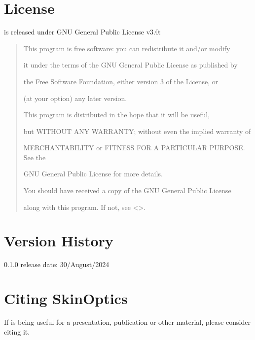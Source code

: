 \documentclass[letterpaper,10pt,english]{sphinxmanual}
\begin{document}
\chapter{License}
\label{\detokenize{index:license}}
\sphinxAtStartPar
{} is released under GNU General Public License v3.0:
\begin{quote}

\begin{DUlineblock}{0em}
\item[] This program is free software: you can redistribute it and/or modify
\item[] it under the terms of the GNU General Public License as published by
\item[] the Free Software Foundation, either version 3 of the License, or
\item[] (at your option) any later version.
\end{DUlineblock}

\begin{DUlineblock}{0em}
\item[] This program is distributed in the hope that it will be useful,
\item[] but WITHOUT ANY WARRANTY; without even the implied warranty of
\item[] MERCHANTABILITY or FITNESS FOR A PARTICULAR PURPOSE.  See the
\item[] GNU General Public License for more details.
\end{DUlineblock}

\begin{DUlineblock}{0em}
\item[] You should have received a copy of the GNU General Public License
\item[] along with this program.  If not, see \textless{}\textgreater{}.
\end{DUlineblock}
\end{quote}


\chapter{Version History}
\label{\detokenize{index:version-history}}
\begin{DUlineblock}{0em}
\item[] 0.1.0 \sphinxhyphen{} release date: 30/August/2024
\end{DUlineblock}


\chapter{Citing SkinOptics}
\label{\detokenize{index:citing-skinoptics}}
\sphinxAtStartPar
If  is being useful for a presentation, publication or other material, please consider citing it.
\end{document}

